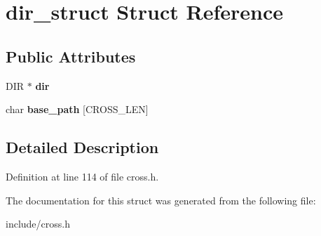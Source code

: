 \hypertarget{structdir__struct}{\section{dir\-\_\-struct Struct Reference}
\label{structdir__struct}
}
\subsection*{Public Attributes}
\begin{DoxyCompactItemize}
\item 
\hypertarget{structdir__struct_a972565488eed4eb755a2b2604e2fa9c5}{D\-I\-R $\ast$ {\bfseries dir}}\label{structdir__struct_a972565488eed4eb755a2b2604e2fa9c5}

\item 
\hypertarget{structdir__struct_a9cb3bc0a6f7312b318b93c25602ef196}{char {\bfseries base\-\_\-path} \mbox{[}C\-R\-O\-S\-S\-\_\-\-L\-E\-N\mbox{]}}\label{structdir__struct_a9cb3bc0a6f7312b318b93c25602ef196}

\end{DoxyCompactItemize}


\subsection{Detailed Description}


Definition at line 114 of file cross.\-h.



The documentation for this struct was generated from the following file\-:\begin{DoxyCompactItemize}
\item 
include/cross.\-h\end{DoxyCompactItemize}
